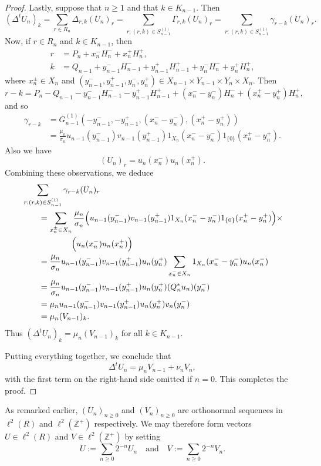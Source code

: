 \documentclass[11pt,reqno]{amsart}
\theoremstyle{plain}
\theoremstyle{definition}
\theoremstyle{remark}
\newcommand{\ZZ}{\mathbb{Z}}
\begin{document}
\begin{proof}
Lastly, suppose that $n\ge1$ and that $k\in K_{n-1}$. Then
\[
(\Delta^t U_n)_k=\sum_{r\in R_n}\Delta_{r,k}(U_n)_r
=\sum_{r:(r,k)\in S_{n-1}^{(1)}}\Gamma_{r,k}(U_n)_r
=\sum_{r:(r,k)\in S_{n-1}^{(1)}}\gamma_{r-k}(U_n)_r.
\]
Now, if $r\in R_n$ and $k\in K_{n-1}$, then
\begin{align*}
r&=P_n+x_n^{-}H_n^-+x_n^+H_n^+,\\
k&=Q_{n-1}+y_{n-1}^-H_{n-1}^-+y_{n-1}^+H_{n-1}^++y_{n}^-H_{n}^-+y_{n}^+H_{n}^+,
\end{align*}
where $x_n^\pm\in X_n$ and $(y_{n-1}^-,y_{n-1}^+,y_{n}^-,y_{n}^+)\in X_{n-1}\times Y_{n-1}\times Y_{n}\times X_{n}$.
Then
\[
r-k=P_n-Q_{n-1}-y_{n-1}^-H_{n-1}^--y_{n-1}^+H_{n-1}^++(x_n^--y_{n}^-)H_{n}^-+(x_n^+-y_{n}^+)H_{n}^+,
\]
and so
\begin{align*}
\gamma_{r-k}
&=G_{n-1}^{(1)}(-y_{n-1}^-,-y_{n-1}^+,(x_n^--y_n^-),(x_n^+-y_n^+))\\
&=\frac{\mu_{n}}{\sigma_{n}} u_{n-1}(y_{n-1}^-)v_{n-1}(y_{n-1}^+)1_{X_n}(x_n^--y_n^-)1_{\{0\}}(x_n^+-y_n^+).
\end{align*}
Also we have
\[
(U_n)_r=u_n(x_n^-)u_n(x_n^+).
\]
Combining these observations, we deduce
\begin{align*}
&\sum_{r:(r,k)\in S_{n-1}^{(1)}}\gamma_{r-k}(U_n)_r\\
&\qquad=\sum_{x_n^\pm\in X_n}\frac{\mu_{n}}{\sigma_{n}} \Bigl(u_{n-1}(y_{n-1}^-)v_{n-1}(y_{n-1}^+)1_{X_n}(x_n^--y_n^-)1_{\{0\}}(x_n^+-y_n^+)\Bigr)\times\\
&\qquad\qquad\qquad\Bigl(u_n(x_n^-)u_n(x_n^+)\Bigr)\\
&\qquad=\frac{\mu_n}{\sigma_n}u_{n-1}(y_{n-1}^-)v_{n-1}(y_{n-1}^+)u_{n}(y_n^+)\sum_{x_n^-\in X_n}1_{X_n}(x_n^--y_n^-)u_n(x_n^-)\\
&\qquad=\frac{\mu_n}{\sigma_n}u_{n-1}(y_{n-1}^-)v_{n-1}(y_{n-1}^+)u_{n}(y_n^+)(Q_n^*u_n)(y_n^-)\\
&\qquad=\mu_n u_{n-1}(y_{n-1}^-)v_{n-1}(y_{n-1}^+)u_{n}(y_n^+)v_n(y_n^-)\\
&\qquad=\mu_n(V_{n-1})_k.
\end{align*}
Thus $(\Delta^t U_n)_k=\mu_n(V_{n-1})_k$ for all $k\in K_{n-1}$.

Putting everything together, we conclude that
\[
\Delta^t U_n=\mu_n V_{n-1}+\nu_{n}V_{n},
\]
with the first term on the right-hand side omitted if $n=0$.
This completes the proof.
\end{proof}

As remarked earlier, $(U_n)_{n\ge0}$ and $(V_n)_{n\ge0}$ 
are orthonormal sequences in $\ell^2(R)$ and $\ell^2(\ZZ^+)$
respectively. We may therefore form vectors
$U\in\ell^2(R)$ and $V\in\ell^2(\ZZ^+)$ by setting
\[
U:=\sum_{n\ge0}2^{-n}U_n
\quad\text{and}\quad
V:=\sum_{n\ge0}2^{-n}V_n.
\]
\end{document}
